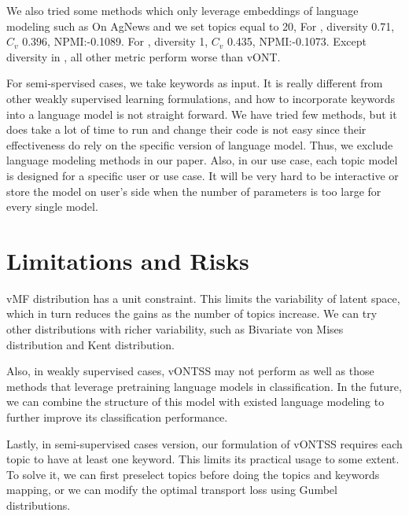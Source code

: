 \documentclass[11pt]{article}
\begin{document}
We also tried some methods which only leverage embeddings of language modeling such as 
On AgNews and we set topics equal to 20, For \cite{wang-etal-2020-neural-topic}, diversity 0.71, $C_v$ 0.396, NPMI:-0.1089. For \cite{Bianchi2021PretrainingIA}, diversity 1, $C_v$ 0.435, NPMI:-0.1073. Except diversity in \cite{Bianchi2021PretrainingIA}, all other metric perform worse than vONT. 

For semi-spervised cases, we take keywords as input. It is really different from other weakly supervised learning formulations, and how to incorporate keywords into a language model is not straight forward. We have tried few methods, but it does take a lot of time to run and change their code is not easy since their effectiveness do rely on the specific version of language model. Thus, we exclude language modeling methods in our paper. Also, in our use case, each topic model is designed for a specific user or use case. It will be very hard to be interactive or store the model on user's side when the number of parameters is too large for every single model.



 \section{Limitations and Risks}
vMF distribution has a unit constraint. This limits the variability of latent space, which in turn reduces the gains as the number of topics increase. We can try other distributions with richer variability, such as Bivariate von Mises distribution and Kent distribution.

Also, in weakly supervised cases, vONTSS may not perform as well as those methods that leverage pretraining language models in classification. In the future, we can combine the structure of this model with existed language modeling to further improve its classification performance.

Lastly, in semi-supervised cases version, our formulation of vONTSS requires each topic to have at least one keyword. This limits its practical usage to some extent. To solve it, we can first preselect topics before doing the topics and keywords mapping, or we can modify the optimal transport loss using Gumbel distributions. 
\end{document}
